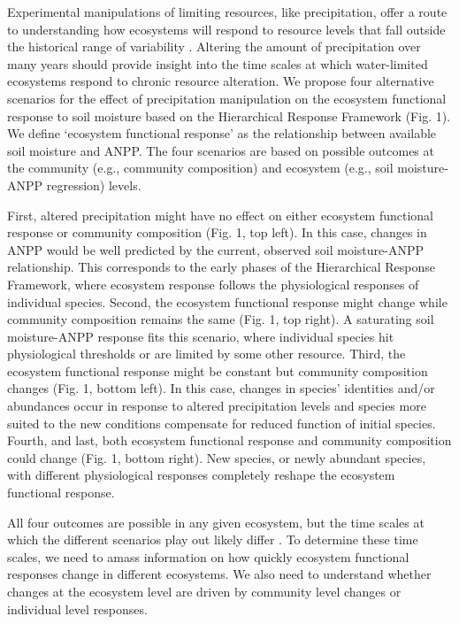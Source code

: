 \documentclass[fleqn,10pt,lineno]{wlpeerj} %
\begin{document}
Experimental manipulations of limiting resources, like precipitation,
offer a route to understanding how ecosystems will respond to resource
levels that fall outside the historical range of variability
\citep{Avolio2015, Gherardi2015, Knapp2017}. Altering the amount of
precipitation over many years should provide insight into the time
scales at which water-limited ecosystems respond to chronic resource
alteration. We propose four alternative scenarios for the effect of
precipitation manipulation on the ecosystem functional response to soil
moisture based on the Hierarchical Response Framework (Fig. 1). We
define `ecosystem functional response' as the relationship between
available soil moisture and ANPP. The four scenarios are based on
possible outcomes at the community (e.g., community composition) and
ecosystem (e.g., soil moisture-ANPP regression) levels.

First, altered precipitation might have no effect on either ecosystem
functional response or community composition (Fig. 1, top left). In this
case, changes in ANPP would be well predicted by the current, observed
soil moisture-ANPP relationship. This corresponds to the early phases of
the Hierarchical Response Framework, where ecosystem response follows
the physiological responses of individual species. Second, the ecosystem
functional response might change while community composition remains the
same (Fig. 1, top right). A saturating soil moisture-ANPP response fits
this scenario, where individual species hit physiological thresholds or
are limited by some other resource. Third, the ecosystem functional
response might be constant but community composition changes (Fig. 1,
bottom left). In this case, changes in species' identities and/or
abundances occur in response to altered precipitation levels and species
more suited to the new conditions compensate for reduced function of
initial species. Fourth, and last, both ecosystem functional response
and community composition could change (Fig. 1, bottom right). New
species, or newly abundant species, with different physiological
responses completely reshape the ecosystem functional response.

All four outcomes are possible in any given ecosystem, but the time
scales at which the different scenarios play out likely differ
\citep{Smith2009, Wilcox2016, Knapp2017}. To determine these time
scales, we need to amass information on how quickly ecosystem functional
responses change in different ecosystems. We also need to understand
whether changes at the ecosystem level are driven by community level
changes or individual level responses.
\end{document}
